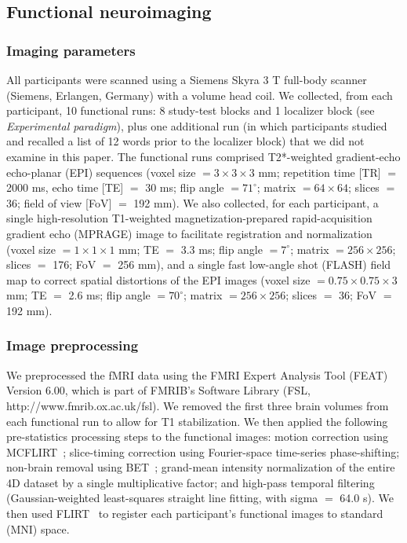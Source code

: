 \documentclass[11pt]{article}
\begin{document}
\subsection*{Functional neuroimaging}
\subsubsection*{Imaging parameters}
All participants were scanned using a Siemens Skyra 3 T full-body
scanner (Siemens, Erlangen, Germany) with a volume head coil.  We
collected, from each participant, 10 functional runs: 8 study-test
blocks and 1 localizer block (see \textit{Experimental paradigm}),
plus one additional run (in which participants studied and recalled a
list of 12 words prior to the localizer block) that we did not examine
in this paper.  The functional runs comprised T2*-weighted
gradient-echo echo-planar (EPI) sequences (voxel size
$= 3 \times 3 \times 3$ mm; repetition time [TR] $=$ 2000 ms, echo
time [TE] $=$ 30 ms; flip angle $= 71^\circ$; matrix $= 64 \times 64$;
slices $=$ 36; field of view [FoV] $=$ 192 mm).  We also collected,
for each participant, a single high-resolution T1-weighted
magnetization-prepared rapid-acquisition gradient echo (MPRAGE) image
to facilitate registration and normalization (voxel size
$= 1 \times 1 \times 1$ mm; TE $=$ 3.3 ms; flip angle $= 7^\circ$;
matrix $= 256 \times 256$; slices $=$ 176; FoV $=$ 256 mm), and a
single fast low-angle shot (FLASH) field map to correct spatial
distortions of the EPI images (voxel size
$= 0.75 \times 0.75 \times 3$ mm; TE $=$ 2.6 ms; flip angle
$= 70^\circ$; matrix $= 256 \times 256$; slices $=$ 36; FoV $=$ 192
mm).

\subsubsection*{Image preprocessing}
We preprocessed the fMRI data using the FMRI Expert Analysis Tool
(FEAT) Version 6.00, which is part of FMRIB's Software Library (FSL,
http://www.fmrib.ox.ac.uk/fsl).  We removed the first three brain
volumes from each functional run to allow for T1 stabilization.  We
then applied the following pre-statistics processing steps to the
functional images: motion correction using MCFLIRT~\citep{JenkEtal02};
slice-timing correction using Fourier-space time-series
phase-shifting; non-brain removal using BET~\citep{Smit02b};
grand-mean intensity normalization of the entire 4D dataset by a
single multiplicative factor; and high-pass temporal filtering
(Gaussian-weighted least-squares straight line fitting, with sigma $=$
64.0 s).  We then used FLIRT~\citep{JenkEtal02} to
register each participant's functional images to standard (MNI) space.
\end{document}
